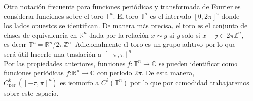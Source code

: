 \documentclass[12pt]{article}
\begin{document}
Otra notación frecuente para funciones periódicas y transformada de Fourier es considerar funciones sobre el toro $\mathbb{T}^n$. El toro $\mathbb{T}^n$ es el intervalo $[0,2 \pi]^n$ donde los lados opuestos se identifican. De manera más precisa, el toro es el conjunto de clases de equivalencia en $\mathbb{R}^n$ dada por la relación $x \sim y$ si $y$ solo si $x-y \in 2 \pi \mathbb{Z}^n$, es decir $\mathbb{T}^n=\mathbb{R}^n/ 2 \pi \mathbb{Z}^n$. Adicionalmente el toro es un grupo aditivo por lo que será útil hacerle una traslación a $[-\pi,\pi]^n$\\

Por las propiedades anteriores, funciones $f: \mathbb{T}^n \rightarrow \mathbb{C}$ se pueden identificar como funciones periódicas $f: \mathbb{R}^n \rightarrow \mathbb{C}$ con periodo $2 \pi$. De esta manera, $C_{\text {per }}^k([-\pi, \pi]^n)$ es isomorfo a $C^k(\mathbb{T}^n)$ por lo que por comodidad trabajaremos sobre este espacio. \cite{ogrianoc}\\
\end{document}

